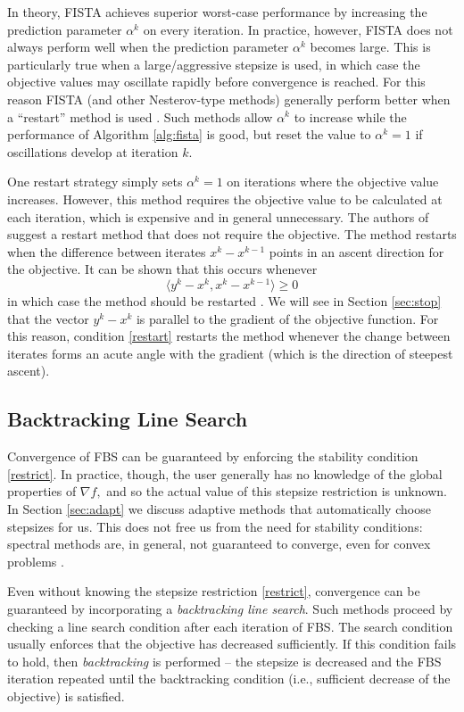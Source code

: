 \documentclass{amsart}
\newcommand{\eqn}[2]{\begin{equation}\label{#1}#2\end{equation}}
\newcommand{\ra}{\rangle}
\newcommand{\la}{\langle}
\theoremstyle{definition}
\begin{document}
In theory, FISTA achieves superior worst-case performance by increasing the prediction parameter $\alpha^k$ on every iteration. In practice, however, FISTA does not always perform well when the prediction parameter $\alpha^k$ becomes large.  This is particularly true when a large/aggressive stepsize is used, in which case the objective values may oscillate rapidly before convergence is reached.  For this reason FISTA (and other Nesterov-type methods) generally perform better when a ``restart'' method is used  \cite{OC12}. Such methods allow $\alpha^k$ to increase while the performance of Algorithm \ref{alg:fista} is good, but reset the value to $\alpha^k=1$ if oscillations develop at iteration $k.$    
 
   One restart strategy simply sets $\alpha^k=1$ on iterations where the objective value increases.  However, this method requires the objective value to be calculated at each iteration, which is expensive and in general unnecessary.  The authors of \cite{OC12} suggest a restart method that does not require the objective.  The method restarts when the difference between iterates $x^k-x^{k-1}$ points in an ascent direction for the objective. It can be shown that this occurs whenever
      \eqn{restart}{\la y^k-x^k , x^k-x^{k-1}\ra \ge 0}
in which case the method should be restarted \cite{OC12}.  We will see in Section \ref{sec:stop} that the vector $y^k-x^k$ is parallel to the gradient of the objective function.  For this reason, condition \eqref{restart} restarts the method whenever the change between iterates forms an acute angle with the gradient (which is the direction of steepest ascent).

\subsection{Backtracking Line Search} \label{sec:linesearch}

Convergence of FBS can be guaranteed by enforcing the stability condition \eqref{restrict}.  In practice, though, the user generally has no knowledge of the global properties of $\nabla f,$ and so the actual value of this stepsize restriction is unknown.  In Section \ref{sec:adapt} we discuss adaptive methods that automatically choose stepsizes for us.  This does not free us from the need for stability conditions: spectral methods are, in general,  not guaranteed to converge, even for convex problems \cite{BMR00}.  

Even without knowing the stepsize restriction \eqref{restrict},  convergence can be guaranteed by incorporating a \emph{backtracking line search}.   Such methods proceed by checking a line search condition after each iteration of FBS.   The search condition usually enforces that the objective has decreased sufficiently. If this condition fails to hold, then {\em backtracking} is performed -- the stepsize is decreased and the FBS iteration repeated until the backtracking condition (i.e., sufficient decrease of the objective) is satisfied. 
 
\end{document}
